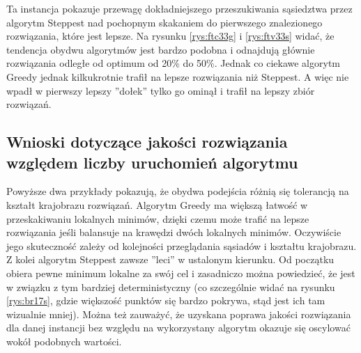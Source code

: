 Ta instancja pokazuje przewagę dokładniejszego przeszukiwania sąsiedztwa przez algorytm Steppest nad pochopnym skakaniem do pierwszego znalezionego rozwiązania, które jest lepsze. Na rysunku \ref{rys:ftc33g} i \ref{rys:ftv33s} widać, że tendencja obydwu algorytmów jest bardzo podobna i odnajdują głównie rozwiązania odległe od optimum od 20\% do 50\%. Jednak co ciekawe algorytm Greedy jednak kilkukrotnie trafił na lepsze rozwiązania niż Steppest. A więc nie wpadł w pierwszy lepszy ''dołek'' tylko go ominął i trafił na lepszy zbiór rozwiązań.

\subsection{Wnioski dotyczące jakości rozwiązania względem liczby uruchomień algorytmu}
Powyższe dwa przykłady pokazują, że obydwa podejścia różnią się tolerancją na kształt krajobrazu rozwiązań. Algorytm Greedy ma większą łatwość w przeskakiwaniu lokalnych minimów, dzięki czemu może trafić na lepsze rozwiązania jeśli balansuje na krawędzi dwóch lokalnych minimów. Oczywiście jego skuteczność zależy od kolejności przeglądania sąsiadów i kształtu krajobrazu. Z kolei algorytm Steppest zawsze ''leci'' w ustalonym kierunku. Od początku obiera pewne minimum lokalne za swój cel i zasadniczo można powiedzieć, że jest w związku z tym bardziej deterministyczny (co szczególnie widać na rysunku \ref{rys:br17s}, gdzie większość punktów się bardzo pokrywa, stąd jest ich tam wizualnie mniej). Można też zauważyć, że uzyskana poprawa jakości rozwiązania dla danej instancji bez względu na wykorzystany algorytm okazuje się oscylować wokół podobnych wartości.